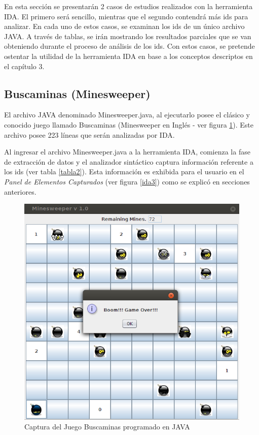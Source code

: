\documentclass[a4paper,12pt]{report}
\begin{document}
En esta sección se presentarán 2 casos de estudios realizados con la herramienta IDA. El primero será sencillo, mientras que el segundo contendrá más ids para analizar. En cada uno de estos casos, se examinan los ids de un único archivo JAVA. A través de tablas, se irán mostrando los resultados parciales que se van obteniendo durante el proceso de análisis de los ids.
Con estos casos, se pretende ostentar la utilidad de la herramienta IDA en base a los conceptos descriptos en el capítulo 3.

\subsection{Buscaminas (Minesweeper)}

El archivo JAVA denominado Minesweeper.java, al ejecutarlo posee el clásico y conocido juego llamado Buscaminas (Minesweeper en Inglés - ver figura \ref{caso1}). Este archivo posee 223 líneas que serán analizadas por IDA.

Al ingresar el archivo Minesweeper.java a la herramienta IDA, comienza la fase de extracción de datos y el analizador sintáctico captura información referente a los ids (ver tabla \ref{tabla2}). Esta información es exhibida para el usuario en el \textit{Panel de Elementos Capturados} (ver figura \ref{ida3}) como se explicó en secciones anteriores.

\begin{figure}[t] %
\centerline{%
\includegraphics[scale= 0.5]{./caso_01.png}
}
\caption{Captura del Juego Buscaminas programado en JAVA}
\label{caso1}
\end{figure}
\end{document}
